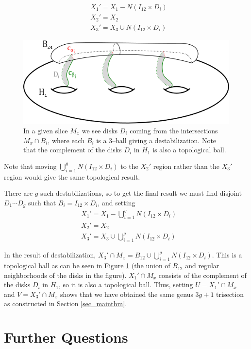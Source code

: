 \documentclass[12pt]{amsart}
\theoremstyle{definition}
\theoremstyle{remark}
\begin{document}
\begin{align*}
&X_1' = X_1 - N(I_{12} \times D_i) \\
&X_2' = X_2\\
&X_3' = X_3 \cup N(I_{12} \times D_i)
\end{align*}

\begin{figure}[h]
\centering
\includegraphics[height=1.8in]{gettingU.png}
\caption{In a given slice $M_x$ we see disks $D_i$ coming from the intersections $M_x \cap B_i$, where each $B_i$ is a 3--ball giving a destabilization.  Note that the complement of the disks $D_i$ in $H_1$ is also a topological ball.  }
\label{getU}
\end{figure}

Note that moving $\bigcup_{i=1}^g N(I_{12} \times D_i)$ to the $X_2'$ region rather than the $X_3'$ region would give the same topological result.

There are $g$ such destabilizations, so to get the final result we must find disjoint $D_1 \cdots D_g$ such that $B_i = I_{12} \times D_i$, and setting
\begin{align*}
&X_1' = X_1 - \bigcup_{i=1}^g N(I_{12} \times D_i) \\
&X_2' = X_2\\
&X_3' = X_3 \cup \bigcup_{i=1}^g N(I_{12} \times D_i)
\end{align*}

In the result of destabilization, $X_3' \cap M_x = B_{12} \cup \bigcup_{i=1}^g N(I_{12} \times D_i)$.  This is a topological ball as can be seen in Figure \ref{getU} (the union of $B_{12}$ and regular neighborhoods of the disks in the figure).  $X_1' \cap M_x$ consists of the complement of the disks $D_i$ in $H_1$, so it is also a topological ball.  Thus, setting $U=X_1' \cap M_x$ and $V = X_3' \cap M_x$ shows that we have obtained the same genus $3g+1$ trisection as constructed in Section \ref{sec_mainthm}.


\section{Further Questions}
\label{sec_questions}
\end{document}
